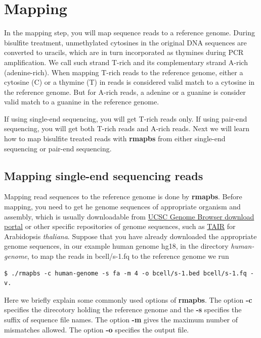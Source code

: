 \documentclass{article}
\begin{document}
\section{Mapping}
\label{sec:mapping}


In the mapping step, you will map sequence reads to a reference
genome. During bisulfite treatment, unmethylated cytosines in the
original DNA sequences are converted to uracils, which are in turn
incorporated as thymines during PCR amplification. We call such strand
T-rich and its complementary strand A-rich (adenine-rich).  When
mapping T-rich reads to the reference genome, either a cytosine (C) or
a thymine (T) in reads is considered valid match to a cytosine in the
reference genome. But for A-rich reads, a adenine or a guanine is
consider valid match to a guanine in the reference genome.    

If using single-end sequencing, you will get T-rich reads only. If
using pair-end sequencing, you will get both T-rich reads and A-rich
reads. Next we will learn how to map bisulfite treated reads with
\textbf{rmapbs} from either single-end sequencing or pair-end
sequencing. 

\subsection{Mapping single-end sequencing reads}
\label{sec:mapping-single-end}
Mapping read sequences to the reference genome is done by
\textbf{rmapbs}. Before mapping, you need to get he genome sequences
of appropriate organism and assembly, which is usually downloadable
from \href{http://hgdownload.cse.ucsc.edu/downloads.html}{UCSC Genome
  Browser download portal} or other specific repositories of genome
sequences, such as \href{http://www.arabidopsis.org/}{TAIR} for
Arabidopsis \textit{thaliana}. Suppose that you have already
downloaded the appropriate genome sequences, in our example human
genome hg18, in the directory \textit{human-genome}, to map the reads
in bcell/s-1.fq to the reference genome we run
\begin{verbatim}
$ ./rmapbs -c human-genome -s fa -m 4 -o bcell/s-1.bed bcell/s-1.fq -v. 
\end{verbatim}
Here we briefly explain some commonly used options of
\textbf{rmapbs}. The option \textbf{-c} specifies the direcotory
holding the reference genome and the \textbf{-s} specifies the suffix
of sequence file names. The option \textbf{-m} gives the maximum
number of mismatches allowed. The option \textbf{-o} specifies the
output file. 
\end{document}
